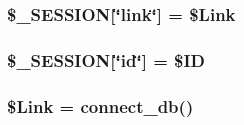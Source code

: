 \subsubsection{\setlength{\rightskip}{0pt plus 5cm}\$\_\-SESSION[\char`\"{}link\char`\"{}] = \$Link}\label{login_8php_584cb515f40b6a26d9bd4e84454fb913}


\subsubsection{\setlength{\rightskip}{0pt plus 5cm}\$\_\-SESSION[\char`\"{}id\char`\"{}] = \$ID}\label{login_8php_97989314f196419260dc25d0a04cb0e6}


\subsubsection{\setlength{\rightskip}{0pt plus 5cm}\$Link = connect\_\-db()}\label{login_8php_eabe0ef548439095080c9a173b3a609d}


